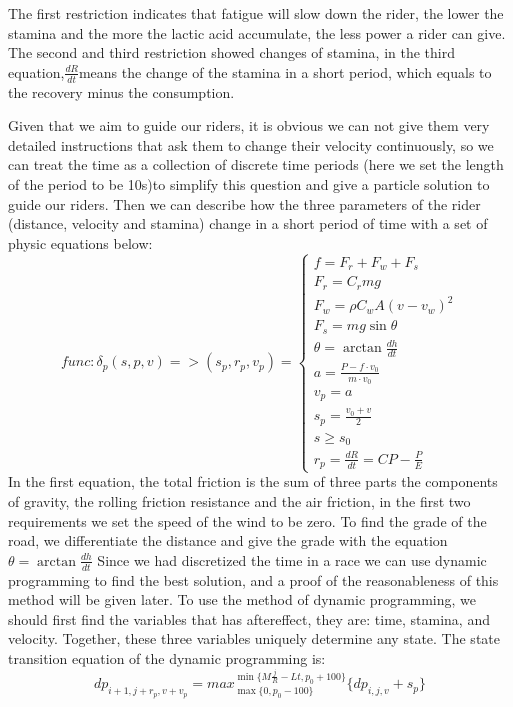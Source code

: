 \documentclass[12pt]{article}
\begin{document}
The first restriction indicates that fatigue will slow down the rider, the lower the stamina and the more the lactic acid accumulate, the less power a rider can give.
The second and third restriction showed changes of stamina, in the third equation,$\frac{d R}{d t}$means the change of the stamina in a short period, which equals to the
recovery minus the consumption.

Given that we aim to guide our riders, it is obvious we can not give them very detailed instructions that ask them to change their velocity continuously, so we can treat the time
as a collection of discrete time periods (here we set the length of the period to be 10s)to simplify this question and give a particle solution to guide our riders.
Then we can describe how the three parameters of the rider (distance, velocity and stamina) change in a short period of time with a set of physic equations below:
\begin{equation}
    func: \delta_p(s,p,v)=>(  s_p, r_p, v_p)=\left\{
    \begin{array}{c}
        f=F_r+F_w+F_s                     \\%
        F_r=C_rmg                         \\%
        F_w=\rho C_w A(v-v_w)^2           \\%
        F_s=mg\sin \theta                 \\
        \theta=\arctan\frac{d h}{d t}     \\%
        a=\frac{P-f\cdot v_0}{m\cdot v_0} \\
        v_p=a                             \\
        s_p=\frac{v_0+v}{2}               \\
        s\geqslant s_0                    \\
        r_p=\frac{d R}{d t} =CP-\frac{P}{E}
    \end{array}
    \right.
\end{equation}
In the first equation, the total friction is the sum of three parts the components of gravity, the rolling friction resistance and the air friction,
in the first two requirements we set the speed of the wind to be zero. To find the grade of the road, we differentiate the distance and give the grade with the equation
$\theta=\arctan\frac{d h}{d t}$
Since we had discretized the time in a race we can use dynamic programming to find the best solution,
and a proof of the reasonableness of this method will be given later.
To use the method of dynamic programming, we should first find the variables that has aftereffect, they are:  time, stamina, and velocity. Together, these three variables
uniquely determine any state.
The state transition equation of the dynamic programming is:\begin{equation}dp_{i+1,j+r_p,v+v_p}= max_{\max\{0,p_0-100\}}^{\min\{M\frac{j}{R}-Lt,p_0+100\}}\{dp_{i,j,v}+s_p\}\end{equation}
\end{document}
